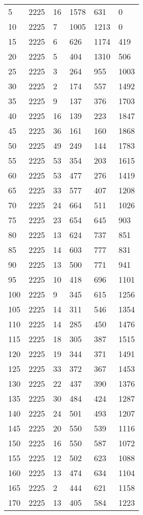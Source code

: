 \begin{longtable}{|l|l|l|l|l|l|}
5 & 2225 & 16 & 1578 & 631 & 0 \\
10 & 2225 & 7 & 1005 & 1213 & 0 \\
15 & 2225 & 6 & 626 & 1174 & 419 \\
20 & 2225 & 5 & 404 & 1310 & 506 \\
25 & 2225 & 3 & 264 & 955 & 1003 \\
30 & 2225 & 2 & 174 & 557 & 1492 \\
35 & 2225 & 9 & 137 & 376 & 1703 \\
40 & 2225 & 16 & 139 & 223 & 1847 \\
45 & 2225 & 36 & 161 & 160 & 1868 \\
50 & 2225 & 49 & 249 & 144 & 1783 \\
55 & 2225 & 53 & 354 & 203 & 1615 \\
60 & 2225 & 53 & 477 & 276 & 1419 \\
65 & 2225 & 33 & 577 & 407 & 1208 \\
70 & 2225 & 24 & 664 & 511 & 1026 \\
75 & 2225 & 23 & 654 & 645 & 903 \\
80 & 2225 & 13 & 624 & 737 & 851 \\
85 & 2225 & 14 & 603 & 777 & 831 \\
90 & 2225 & 13 & 500 & 771 & 941 \\
95 & 2225 & 10 & 418 & 696 & 1101 \\
100 & 2225 & 9 & 345 & 615 & 1256 \\
105 & 2225 & 14 & 311 & 546 & 1354 \\
110 & 2225 & 14 & 285 & 450 & 1476 \\
115 & 2225 & 18 & 305 & 387 & 1515 \\
120 & 2225 & 19 & 344 & 371 & 1491 \\
125 & 2225 & 33 & 372 & 367 & 1453 \\
130 & 2225 & 22 & 437 & 390 & 1376 \\
135 & 2225 & 30 & 484 & 424 & 1287 \\
140 & 2225 & 24 & 501 & 493 & 1207 \\
145 & 2225 & 20 & 550 & 539 & 1116 \\
150 & 2225 & 16 & 550 & 587 & 1072 \\
155 & 2225 & 12 & 502 & 623 & 1088 \\
160 & 2225 & 13 & 474 & 634 & 1104 \\
165 & 2225 & 2 & 444 & 621 & 1158 \\
170 & 2225 & 13 & 405 & 584 & 1223 \\

\end{longtable}
